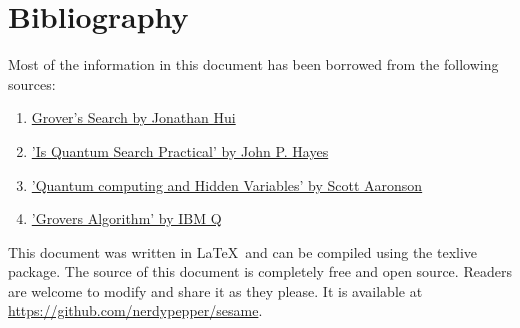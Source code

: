 \documentclass[a4paper]{article}
\begin{document}
\section{ Bibliography }

Most of the information in this document has been borrowed from the following 
sources:

\begin{enumerate}
    \item \href{https://medium.com/@jonathan_hui/qc-grovers-algorithm-cd81e61cf248}{Grover's Search by Jonathan Hui}
    \item \href{https://web.eecs.umich.edu/~imarkov/pubs/jour/cise05-grov.pdf}{'Is Quantum Search Practical' by John P. Hayes}
    \item \href{https://www.scottaaronson.com/papers/qchvpra.pdf}{'Quantum computing and Hidden Variables' by Scott Aaronson}
    \item \href{https://quantumexperience.ng.bluemix.net/proxy/tutorial/full-user-guide/004-Quantum_Algorithms/}{'Grovers Algorithm' by IBM Q}
\end{enumerate}

This document was written in \LaTeX ~and can be compiled using the texlive
package. The source of this document is completely free and open source.
Readers are welcome to modify and share it as they please.  It is available at
\url{https://github.com/nerdypepper/sesame}.
\end{document}
